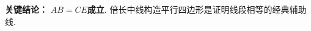 \begin{examplebox}
	\textbf{\textcolor{CExample}{关键结论：}}
	\textbf{$AB = CE$成立}. 倍长中线构造平行四边形是证明线段相等的经典辅助线.
\end{examplebox}
